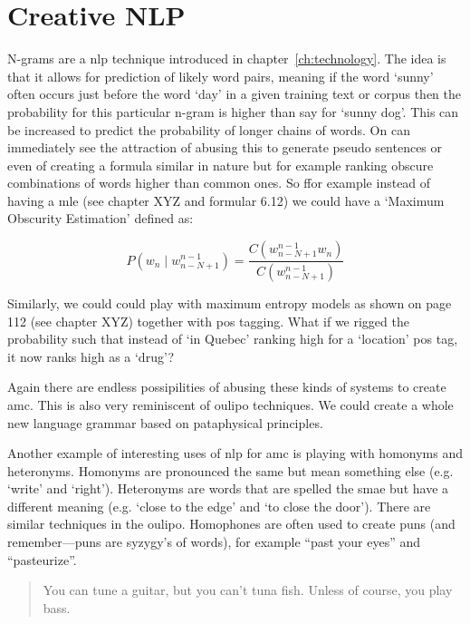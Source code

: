 \section{Creative NLP}
N-grams are a \gls{nlp} technique introduced in chapter~\ref{ch:technology}. The idea is that it allows for prediction of likely word pairs, meaning if the word `sunny' often occurs just before the word `day' in a given training text or corpus then the probability for this particular n-gram is higher than say for `sunny dog'. This can be increased to predict the probability of longer chains of words. On can immediately see the attraction of abusing this to generate pseudo sentences or even of creating a formula similar in nature but for example ranking obscure combinations of words higher than common ones. So ffor example instead of having a \gls{mle} (see chapter XYZ and formular 6.12) we could have a `Maximum Obscurity Estimation' defined as:

\begin{equation}
  P(w_n \mid w_{n-N+1}^{n-1}) = \frac{C(w_{n-N+1}^{n-1} w_n)}{C(w_{n-N+1}^{n-1})}
  \label{eq:probmoe}
\end{equation}

Similarly, we could could play with maximum entropy models as shown on page 112 (see chapter XYZ) together with \gls{pos} tagging. What if we rigged the probability such that instead of `in Quebec' ranking high for a `location' \gls{pos} tag, it now ranks high as a `drug'?


Again there are endless possipilities of abusing these kinds of systems to create \gls{amc}. This is also very reminiscent of \gls{oulipo} techniques. We could create a whole new language grammar based on pataphysical principles.

Another example of interesting uses of \gls{nlp} for \gls{amc} is playing with homonyms and heteronyms. Homonyms are pronounced the same but mean something else (e.g. `write' and `right'). Heteronyms are words that are spelled the smae but have a different meaning (e.g. `close to the edge' and `to close the door'). There are similar techniques in the \gls{oulipo}. Homophones are often used to create puns (and remember---puns are syzygy's of words), for example ``past your eyes'' and ``pasteurize''. 

\begin{quotation}
   You can tune a guitar, but you can't tuna fish. Unless of course, you play bass. 
\end{quotation}

